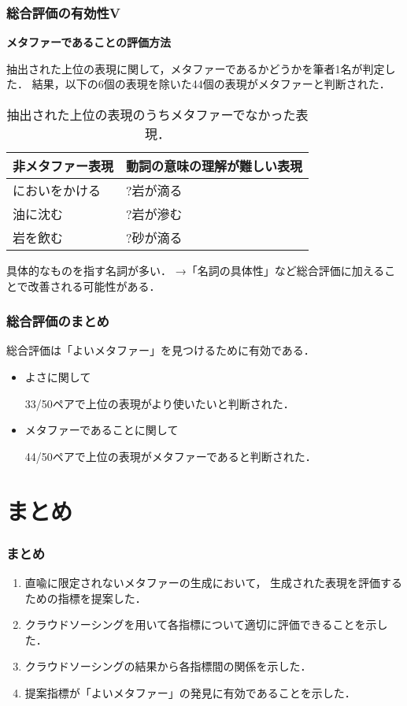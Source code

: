 \documentclass[12pt,usepdftitle=false]{beamer}
\newcommand\header[1]{\multicolumn{1}{c}{\textbf{#1}}}
\begin{document}
\begin{frame}
    \frametitle{総合評価の有効性V}
    \textbf{メタファーであることの評価方法}

    抽出された上位の表現に関して，メタファーであるかどうかを筆者1名が判定した．
    結果，以下の6個の表現を除いた44個の表現がメタファーと判断された．

    \bigskip

    \begin{table}
        \centering\footnotesize
        \begin{tabular}{ll}
            \toprule
            \header{非メタファー表現} & \header{動詞の意味の理解が難しい表現} \\
            \midrule
            においをかける & ?岩が滴る \\
            油に沈む       & ?岩が滲む  \\
            岩を飲む       & ?砂が滴る  \\
            \bottomrule
        \end{tabular}
        \caption{抽出された上位の表現のうちメタファーでなかった表現．}\label{tab:ismet}
    \end{table}

    具体的なものを指す名詞が多い．
    →「名詞の具体性」など総合評価に加えることで改善される可能性がある．
\end{frame}

\begin{frame}
    \frametitle{総合評価のまとめ}
   総合評価は「よいメタファー」を見つけるために有効である．
    \begin{itemize}
        \item よさに関して

            33/50ペアで上位の表現がより使いたいと判断された．
        \item メタファーであることに関して

            44/50ペアで上位の表現がメタファーであると判断された．
    \end{itemize}
\end{frame}

\section{まとめ}
\begin{frame}
    \frametitle{まとめ}
    \addtolength{\leftmargini}{-1\zw}
    \begin{enumerate}
        \item 直喩に限定されないメタファーの生成において，
            生成された表現を評価するための指標を提案した．
        \item クラウドソーシングを用いて各指標について適切に評価できることを示した．
        \item クラウドソーシングの結果から各指標間の関係を示した．
        \item 提案指標が「よいメタファー」の発見に有効であることを示した．
    \end{enumerate}
\end{frame}
\end{document}

